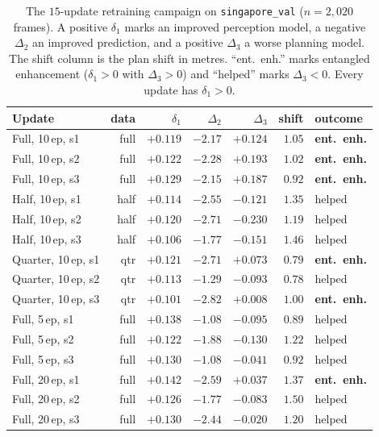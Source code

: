 \documentclass[conference]{IEEEtran}
\begin{document}
\begin{table}[htbp]
\caption{The $15$-update retraining campaign on \texttt{singapore\_val}
($n=2{,}020$ frames). A positive $\delta_1$ marks an improved perception model, a negative
$\Delta_2$ an improved prediction, and a positive $\Delta_3$ a worse planning model. The
shift column is the plan shift in metres. ``ent.\ enh.'' marks entangled
enhancement ($\delta_1>0$ with $\Delta_3>0$) and ``helped'' marks $\Delta_3<0$.
Every update has $\delta_1>0$.}
\label{tab:campaign}
\centering
\renewcommand{\arraystretch}{1.15}
\setlength{\tabcolsep}{3.5pt}
\footnotesize
\begin{tabular}{@{}lrrrrrl@{}}
\toprule
\textbf{Update} & \textbf{data} & \textbf{$\delta_1$} & \textbf{$\Delta_2$} & \textbf{$\Delta_3$} & \textbf{shift} & \textbf{outcome} \\
\midrule
Full, 10\,ep, s1     & full & $+0.119$ & $-2.17$ & $+0.124$ & $1.05$ & \textbf{ent.\ enh.} \\
Full, 10\,ep, s2     & full & $+0.122$ & $-2.28$ & $+0.193$ & $1.02$ & \textbf{ent.\ enh.} \\
Full, 10\,ep, s3     & full & $+0.129$ & $-2.15$ & $+0.187$ & $0.92$ & \textbf{ent.\ enh.} \\
Half, 10\,ep, s1     & half & $+0.114$ & $-2.55$ & $-0.121$ & $1.35$ & helped \\
Half, 10\,ep, s2     & half & $+0.120$ & $-2.71$ & $-0.230$ & $1.19$ & helped \\
Half, 10\,ep, s3     & half & $+0.106$ & $-1.77$ & $-0.151$ & $1.46$ & helped \\
Quarter, 10\,ep, s1  & qtr  & $+0.121$ & $-2.71$ & $+0.073$ & $0.79$ & \textbf{ent.\ enh.} \\
Quarter, 10\,ep, s2  & qtr  & $+0.113$ & $-1.29$ & $-0.093$ & $0.78$ & helped \\
Quarter, 10\,ep, s3  & qtr  & $+0.101$ & $-2.82$ & $+0.008$ & $1.00$ & \textbf{ent.\ enh.} \\
Full, 5\,ep, s1      & full & $+0.138$ & $-1.08$ & $-0.095$ & $0.89$ & helped \\
Full, 5\,ep, s2      & full & $+0.122$ & $-1.88$ & $-0.130$ & $1.22$ & helped \\
Full, 5\,ep, s3      & full & $+0.130$ & $-1.08$ & $-0.041$ & $0.92$ & helped \\
Full, 20\,ep, s1     & full & $+0.142$ & $-2.59$ & $+0.037$ & $1.37$ & \textbf{ent.\ enh.} \\
Full, 20\,ep, s2     & full & $+0.126$ & $-1.77$ & $-0.083$ & $1.50$ & helped \\
Full, 20\,ep, s3     & full & $+0.130$ & $-2.44$ & $-0.020$ & $1.20$ & helped \\
\bottomrule
\end{tabular}
\end{table}
\end{document}
